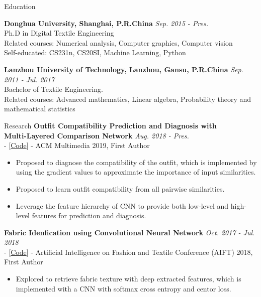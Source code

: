 \documentclass{resume} %
\begin{document}

\begin{rSection}{Education}

{\bf Donghua University, Shanghai, P.R.China} \hfill {\em Sep. 2015 - Pres.} 
\\ Ph.D in Digital Textile Engineering
\\ Related courses: Numerical analysis, Computer graphics, Computer vision
\\ Self-educated: CS231n, CS20SI, Machine Learning, Python

{\bf Lanzhou University of Technology, Lanzhou, Gansu, P.R.China} \hfill {\em Sep. 2011 - Jul. 2017} 
\\ Bachelor of Textile Engineering.
\\ Related courses: Advanced mathematics, Linear algebra, Probability theory and mathematical statistics


\end{rSection}
\begin{rSection}{Research}
{\bf Outfit Compatibility Prediction and Diagnosis with \\ Multi-Layered Comparison Network} \hfill {\em Aug. 2018 - Pres.}
\\ - [\href{https://github.com/WangXin93/fashion_compatibility_mcn}{Code}] - ACM Multimedia 2019, First Author
\begin{itemize}
    \item Proposed to diagnose the compatibility of the outfit, which is implemented by using the gradient values to approximate the importance of input similarities.
    \item Proposed to learn outfit compatibility from all pairwise similarities.
    \item Leverage the feature hierarchy of CNN to provide both low-level and high-level features for prediction and diagnosis.
\end{itemize}

{\bf Fabric Idenfication using Convolutional Neural Network} \hfill {\em Oct. 2017 - Jul. 2018}
\\ - [\href{https://github.com/WangXin93/FabricID}{Code}] - Artificial Intelligence on Fashion and Textile Conference (AIFT) 2018, First Author
\begin{itemize}
    \item Explored to retrieve fabric texture with deep extracted features, which is implemented with a CNN with softmax cross entropy and centor loss.
\end{itemize}

\end{rSection}
\end{document}
